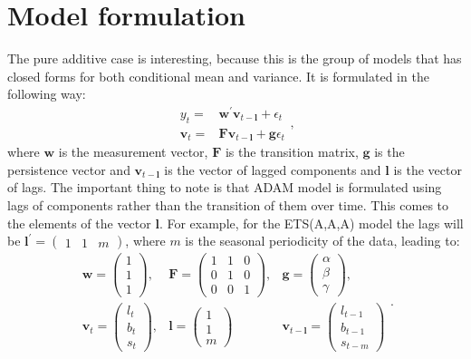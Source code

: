 \documentclass[
]{book}
\theoremstyle{definition}
\theoremstyle{definition}
\theoremstyle{definition}
\theoremstyle{definition}
\theoremstyle{remark}
\begin{document}
\hypertarget{ADAMETSPureAdditive}{%
\section{Model formulation}\label{ADAMETSPureAdditive}}

The pure additive case is interesting, because this is the group of models that has closed forms for both conditional mean and variance. It is formulated in the following way:
\begin{equation}
  \begin{aligned}
    {y}_{t} = &\mathbf{w}^\prime \mathbf{v}_{t-\boldsymbol{l}} + \epsilon_t \\
    \mathbf{v}_{t} = &\mathbf{F} \mathbf{v}_{t-\boldsymbol{l}} + \mathbf{g} \epsilon_t
  \end{aligned},
  \label{eq:ETSADAMStateSpacePureAdditive}
\end{equation}
where \(\mathbf{w}\) is the measurement vector, \(\mathbf{F}\) is the transition matrix, \(\mathbf{g}\) is the persistence vector and \(\mathbf{v}_{t-\boldsymbol{l}}\) is the vector of lagged components and \(\boldsymbol{l}\) is the vector of lags. The important thing to note is that ADAM model is formulated using lags of components rather than the transition of them over time. This comes to the elements of the vector \(\boldsymbol{l}\). For example, for the ETS(A,A,A) model the lags will be \(\boldsymbol{l}^\prime=\begin{pmatrix}1 & 1 & m\end{pmatrix}\), where \(m\) is the seasonal periodicity of the data, leading to:
\begin{equation}
  \begin{aligned}
    \mathbf{w} = \begin{pmatrix} 1 \\ 1 \\ 1 \end{pmatrix}, & \mathbf{F} = \begin{pmatrix} 1 & 1 & 0 \\ 0 & 1 & 0 \\ 0 & 0 & 1 \end{pmatrix}, & \mathbf{g} = \begin{pmatrix} \alpha \\ \beta \\ \gamma \end{pmatrix}, \\
    \mathbf{v}_{t} = \begin{pmatrix} l_t \\ b_t \\ s_t \end{pmatrix}, & \boldsymbol{l} = \begin{pmatrix} 1 \\ 1 \\ m \end{pmatrix} & \mathbf{v}_{t-\boldsymbol{l}} = \begin{pmatrix} l_{t-1} \\ b_{t-1} \\ s_{t-m} \end{pmatrix}
  \end{aligned}.
  \label{eq:ETSADAMAAAMatrices}
\end{equation}
\end{document}
